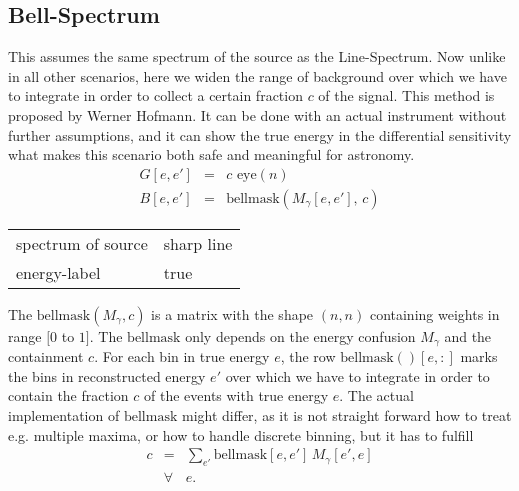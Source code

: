 \documentclass{article}%
\begin{document}
\subsection{Bell-Spectrum}
%
This assumes the same spectrum of the source as the Line-Spectrum.
%
Now unlike in all other scenarios, here we widen the range of background over which we have to integrate in order to collect a certain fraction $c$ of the signal.
%
This method is proposed by Werner Hofmann.
%
It can be done with an actual instrument without further assumptions, and it can show the true energy in the differential sensitivity what makes this scenario both safe and meaningful for astronomy.
%
\begin{eqnarray}
G[e, e'] &=& c \, \, \mathrm{eye}(n)
\\
B[e, e'] &=& \mathrm{bellmask}(M_{\gamma}[e, e'], \, c)
\end{eqnarray}
%
\begin{center}
\begin{tabular}{ll}
spectrum of source & sharp line\\
energy-label & true\\
\end{tabular}
\end{center}
%
The $\mathrm{bellmask}(M_{\gamma}, c)$ is a matrix with the shape $(n,n)$ containing weights in range $[0$ to $1]$.
%
The $\mathrm{bellmask}$ only depends on the energy confusion $M_{\gamma}$ and the containment $c$.
%
For each bin in true energy $e$, the row $\mathrm{bellmask}()[e, :]$ marks the bins in reconstructed energy $e'$ over which we have to integrate in order to contain the fraction $c$ of the events with true energy $e$.
%
The actual implementation of $\mathrm{bellmask}$ might differ, as it is not straight forward how to treat e.g. multiple maxima, or how to handle discrete binning, but it has to fulfill
%
\begin{eqnarray}
c &=& \sum_{e'} \mathrm{bellmask}[e ,e'] \, M_{\gamma}[e', e]\\ &\forall& e.
\end{eqnarray}
%
%
%
\end{document}
